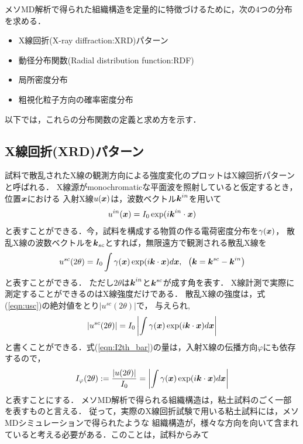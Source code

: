 ﻿メソMD解析で得られた組織構造を定量的に特徴づけるために，次の4つの分布を求める．
\begin{itemize}
	\item X線回折(X-ray diffraction:XRD)パターン
	\item 動径分布関数(Radial distribution function:RDF)
	\item 局所密度分布
	\item 粗視化粒子方向の確率密度分布
\end{itemize}
以下では，これらの分布関数の定義と求め方を示す．
\subsection{X線回折(XRD)パターン}
試料で散乱されたX線の観測方向による強度変化のプロットはX線回折パターンと呼ばれる．
X線源がmonochromaticな平面波を照射していると仮定するとき，位置$\mbox{\boldmath $x$}$における
入射X線$u(\mbox{\boldmath $x$})$は，波数ベクトル$\mbox{\boldmath $k$}^{in}$を用いて
\begin{equation}
	u^{in}(\mbox{\boldmath $x$})=I_0 \exp(i\mbox{\boldmath $k$}^{in}\cdot\mbox{\boldmath $x$})
	\label{eqn:uin}
\end{equation}
と表すことができる．今，試料を構成する物質の作る電荷密度分布を$\gamma(\mbox{\boldmath $x$})$，
散乱X線の波数ベクトルを$\mbox{\boldmath $k$}_{sc}$とすれば，無限遠方で観測される散乱X線を
\begin{equation}
	u^{sc}(2\theta)=I_0 \int \gamma(\fat{x})\exp(i\fat{k}\cdot\fat{x})d\fat{x}, \ \ 
	\left(\fat{k}=\fat{k}^{sc}-\fat{k}^{in}\right)
	\label{eqn:usc}
\end{equation}
と表すことができる．
ただし$2\theta$は$\mbox{\boldmath $k$}^{in}$と$\mbox{\boldmath $k$}^{sc}$が成す角を表す．
X線計測で実際に測定することができるのはX線強度だけである．
散乱X線の強度は，式(\ref{eqn:usc})の絶対値をとり$\left| u^{sc}(2\theta)\right|$で，
与えられ,
\begin{equation}
	\left|u^{sc}(2\theta)\right|
	=
	I_0\left|\int \gamma(\mbox{\boldmath $x$}) \exp(i\mbox{\boldmath $k$}\cdot \mbox{\boldmath $x$}) d\mbox{\boldmath $x$} \right|
	\label{eqn:I2th_bar}
\end{equation}
と書くことができる．式(\ref{eqn:I2th_bar})の量は，入射X線の伝播方向$\varphi$にも依存するので，
\begin{equation}
	I_\varphi(2\theta):
		=\frac{\left|u(2\theta)\right|}{I_0}
		=
	\left|\int \gamma(\mbox{\boldmath $x$}) \exp(i\mbox{\boldmath $k$}\cdot \mbox{\boldmath $x$}) d\mbox{\boldmath $x$} \right|
	\label{eqn:Iphi}
\end{equation}
と表すことにする．
メソMD解析で得られる組織構造は，粘土試料のごく一部を表すものと言える．
従って，実際のX線回折試験で用いる粘土試料には，メソMDシミュレーションで得られたような
組織構造が，様々な方向を向いて含まれていると考える必要がある．このことは，試料からみて
